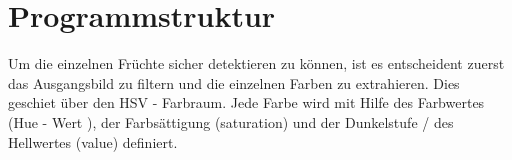
\section{Programmstruktur}
\label{sec:Programmstruktur}

Um die einzelnen Früchte sicher detektieren zu können, ist es entscheident zuerst das Ausgangsbild zu filtern und die einzelnen Farben zu extrahieren. Dies geschiet über den HSV - Farbraum. Jede Farbe wird mit Hilfe des Farbwertes (Hue - Wert ), der Farbsättigung (saturation) und der Dunkelstufe / des Hellwertes (value) definiert. 


 


